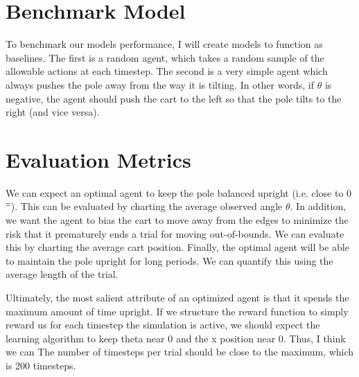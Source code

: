 \documentclass[12pt,a4paper]{article}
\begin{document}
\section*{Benchmark Model}
%
%
To benchmark our models performance, I will create models to function as baselines. The first is a random agent, which takes a random sample of the allowable actions at each timestep. The second is a very simple agent which always pushes the pole away from the way it is tilting. In other words, if $\theta$ is negative, the agent should push the cart to the left so that the pole tilts to the right (and vice versa).
%
\section*{Evaluation Metrics}
%

We can expect an optimal agent to keep the pole balanced upright (i.e. close to 0$\degree$). This can be evaluated by charting the average observed angle $\theta$. In addition, we want the agent to bias the cart to move away from the edges to minimize the risk that it prematurely ends a trial for moving out-of-bounds. We can evaluate this by charting the average cart position. Finally, the optimal agent will be able to maintain the pole upright for long periods. We can quantify this using the average length of the trial.

Ultimately, the most salient attribute of an optimized agent is that it spends the maximum amount of time upright. If we structure the reward function to simply reward us for each timestep the simulation is active, we should expect the learning algorithm to keep theta near 0 and the x position near 0. Thus, I think we can The number of timesteps per trial should be close to the maximum, which is 200 timesteps.
\end{document}
